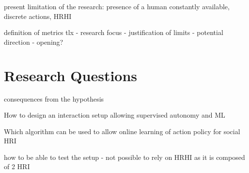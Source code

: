 present limitation of the research: presence of a human constantly available, discrete actions, HRHI

definition of metrics tlx - research focus - justification of limits - potential direction - opening?

\section{Research Questions}

consequences from the hypothesis

How to design an interaction setup allowing supervised autonomy and ML

Which algorithm can be used to allow online learning of action policy for social HRI

how to be able to test the setup - not possible to rely on HRHI as it is composed of 2 HRI